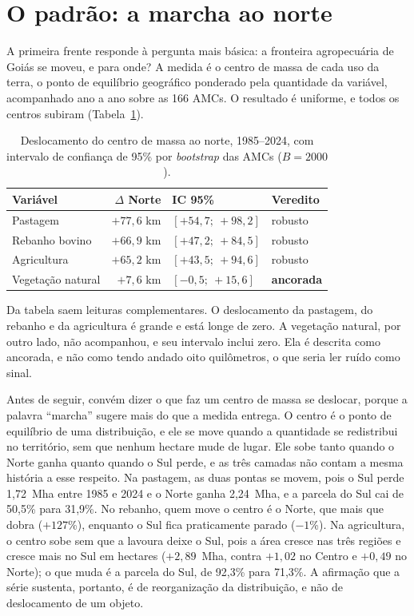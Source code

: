 \section{O padrão: a marcha ao norte}
\label{sec:res-perna1}

A primeira frente responde à pergunta mais básica: a fronteira agropecuária
de Goiás se moveu, e para onde? A medida é o centro de massa de cada uso da
terra, o ponto de equilíbrio geográfico ponderado pela quantidade da
variável, acompanhado ano a ano sobre as 166 AMCs. O resultado é uniforme, e
todos os centros subiram (Tabela~\ref{tab:centros}).

\begin{table}[htb]
\centering
\caption[Deslocamento do centro de massa ao norte, 1985--2024]{Deslocamento do centro de massa ao norte, 1985--2024, com
intervalo de confiança de 95\% por \emph{bootstrap} das AMCs
($B = 2000$).}
\label{tab:centros}
\small
\begin{tabular}{lrll}
\toprule
\textbf{Variável} & \textbf{$\Delta$ Norte} & \textbf{IC 95\%} & \textbf{Veredito} \\
\midrule
Pastagem          & $+77{,}6$ km & $[+54{,}7;\ +98{,}2]$ & robusto \\
Rebanho bovino    & $+66{,}9$ km & $[+47{,}2;\ +84{,}5]$ & robusto \\
Agricultura       & $+65{,}2$ km & $[+43{,}5;\ +94{,}6]$ & robusto \\
Vegetação natural & $+7{,}6$ km  & $[-0{,}5;\ +15{,}6]$  & \textbf{ancorada} \\
\bottomrule
\end{tabular}
\end{table}

Da tabela saem leituras complementares. O deslocamento da pastagem, do rebanho
e da agricultura é grande e está longe de zero. A vegetação natural, por outro
lado, não acompanhou, e seu intervalo inclui zero. Ela é descrita como ancorada,
e não como tendo andado oito quilômetros, o que seria ler ruído como sinal.

Antes de seguir, convém dizer o que faz um centro de massa se deslocar, porque a
palavra ``marcha'' sugere mais do que a medida entrega. O centro é o ponto de
equilíbrio de uma distribuição, e ele se move quando a quantidade se redistribui
no território, sem que nenhum hectare mude de lugar. Ele sobe tanto quando o
Norte ganha quanto quando o Sul perde, e as três camadas não contam a mesma
história a esse respeito. Na pastagem, as duas pontas se movem, pois o Sul perde
1,72~Mha entre 1985 e 2024 e o Norte ganha 2,24~Mha, e a parcela do Sul cai de
50,5\% para 31,9\%. No rebanho, quem move o centro é o Norte, que mais que dobra
(\mbox{$+127$\%}), enquanto o Sul fica praticamente parado (\mbox{$-1$\%}). Na
agricultura, o centro sobe sem que a lavoura deixe o Sul, pois a área cresce nas
três regiões e cresce mais no Sul em hectares (\mbox{$+2{,}89$~Mha}, contra
\mbox{$+1{,}02$} no Centro e \mbox{$+0{,}49$} no Norte); o que muda é a parcela do
Sul, de 92,3\% para 71,3\%. A afirmação que a série sustenta, portanto, é de
reorganização da distribuição, e não de deslocamento de um objeto.

